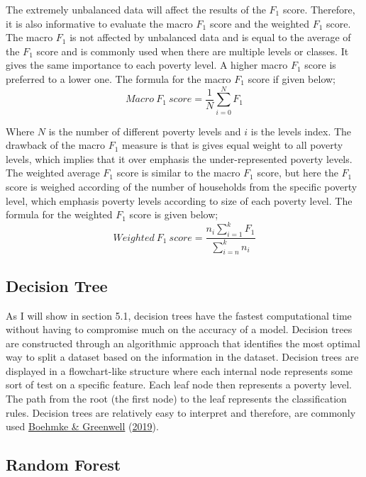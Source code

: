 \documentclass[11pt,preprint, authoryear]{elsarticle}
\numberwithin{equation}{section}
\numberwithin{figure}{section}
\numberwithin{table}{section}
\begin{document}
The extremely unbalanced data will affect the results of the \(F_1\)
score. Therefore, it is also informative to evaluate the macro \(F_1\)
score and the weighted \(F_1\) score. The macro \(F_1\) is not affected
by unbalanced data and is equal to the average of the \(F_1\) score and
is commonly used when there are multiple levels or classes. It gives the
same importance to each poverty level. A higher macro \(F_1\) score is
preferred to a lower one. The formula for the macro \(F_1\) score if
given below; \[ Macro\: F_1\: score = \frac{1}{N}{\sum}_{i=0}^N F_1\]

Where \(N\) is the number of different poverty levels and \(i\) is the
levels index. The drawback of the macro \(F_1\) measure is that is gives
equal weight to all poverty levels, which implies that it over emphasis
the under-represented poverty levels. The weighted average \(F_1\) score
is similar to the macro \(F_1\) score, but here the \(F_1\) score is
weighed according of the number of households from the specific poverty
level, which emphasis poverty levels according to size of each poverty
level. The formula for the weighted \(F_1\) score is given below;
\[ Weighted\: F_1\: score = \frac{n_i\sum_{i=1}^k F_1}{\sum_{i=n}^k n_i}\]

\hypertarget{decision-tree}{%
\subsection{Decision Tree}\label{decision-tree}}

As I will show in section 5.1, decision trees have the fastest
computational time without having to compromise much on the accuracy of
a model. Decision trees are constructed through an algorithmic approach
that identifies the most optimal way to split a dataset based on the
information in the dataset. Decision trees are displayed in a
flowchart-like structure where each internal node represents some sort
of test on a specific feature. Each leaf node then represents a poverty
level. The path from the root (the first node) to the leaf represents
the classification rules. Decision trees are relatively easy to
interpret and therefore, are commonly used
\protect\hyperlink{ref-boehmke2019hands}{Boehmke \& Greenwell}
(\protect\hyperlink{ref-boehmke2019hands}{2019}).

\hypertarget{random-forest}{%
\subsection{Random Forest}\label{random-forest}}
\end{document}
